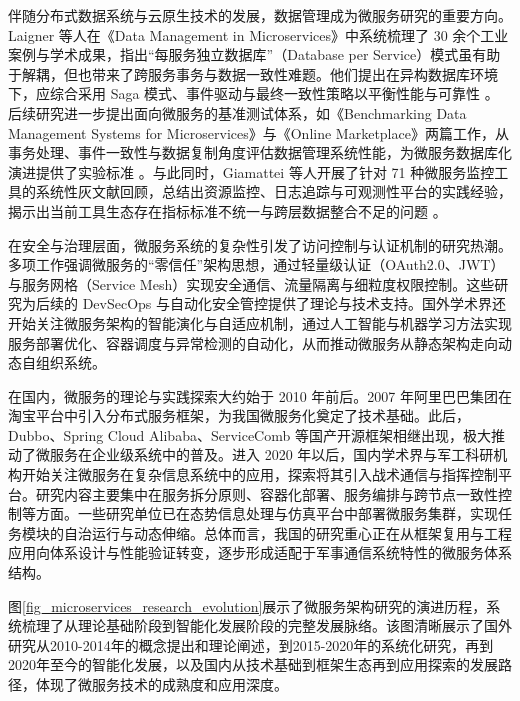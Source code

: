 伴随分布式数据系统与云原生技术的发展，数据管理成为微服务研究的重要方向。Laigner 等人在《Data Management in Microservices》中系统梳理了 30 余个工业案例与学术成果，指出“每服务独立数据库”（Database per Service）模式虽有助于解耦，但也带来了跨服务事务与数据一致性难题。他们提出在异构数据库环境下，应综合采用 Saga 模式、事件驱动与最终一致性策略以平衡性能与可靠性 \cite{Laigner2021Data}。后续研究进一步提出面向微服务的基准测试体系，如《Benchmarking Data Management Systems for Microservices》与《Online Marketplace》两篇工作，从事务处理、事件一致性与数据复制角度评估数据管理系统性能，为微服务数据库化演进提供了实验标准 \cite{BenchmarkingDataMgmt2024,OnlineMarketplace2024}。与此同时，Giamattei 等人开展了针对 71 种微服务监控工具的系统性灰文献回顾，总结出资源监控、日志追踪与可观测性平台的实践经验，揭示出当前工具生态存在指标标准不统一与跨层数据整合不足的问题 \cite{MonitoringTools2024}。

在安全与治理层面，微服务系统的复杂性引发了访问控制与认证机制的研究热潮。多项工作强调微服务的“零信任”架构思想，通过轻量级认证（OAuth2.0、JWT）与服务网格（Service Mesh）实现安全通信、流量隔离与细粒度权限控制。这些研究为后续的 DevSecOps 与自动化安全管控提供了理论与技术支持。国外学术界还开始关注微服务架构的智能演化与自适应机制，通过人工智能与机器学习方法实现服务部署优化、容器调度与异常检测的自动化，从而推动微服务从静态架构走向动态自组织系统。

在国内，微服务的理论与实践探索大约始于 2010 年前后。2007 年阿里巴巴集团在淘宝平台中引入分布式服务框架，为我国微服务化奠定了技术基础。此后，Dubbo、Spring Cloud Alibaba、ServiceComb 等国产开源框架相继出现，极大推动了微服务在企业级系统中的普及。进入 2020 年以后，国内学术界与军工科研机构开始关注微服务在复杂信息系统中的应用，探索将其引入战术通信与指挥控制平台。研究内容主要集中在服务拆分原则、容器化部署、服务编排与跨节点一致性控制等方面。一些研究单位已在态势信息处理与仿真平台中部署微服务集群，实现任务模块的自治运行与动态伸缩。总体而言，我国的研究重心正在从框架复用与工程应用向体系设计与性能验证转变，逐步形成适配于军事通信系统特性的微服务体系结构。

图\ref{fig_microservices_research_evolution}展示了微服务架构研究的演进历程，系统梳理了从理论基础阶段到智能化发展阶段的完整发展脉络。该图清晰展示了国外研究从2010-2014年的概念提出和理论阐述，到2015-2020年的系统化研究，再到2020年至今的智能化发展，以及国内从技术基础到框架生态再到应用探索的发展路径，体现了微服务技术的成熟度和应用深度。

